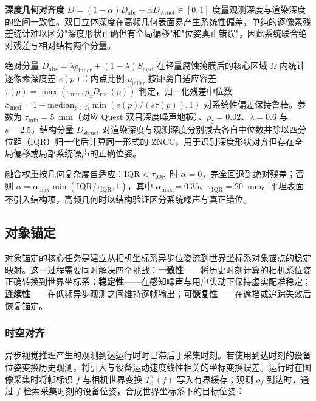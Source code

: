 \documentclass[review]{vgtc}
\begin{document}
\textbf{深度几何对齐度} $D = (1-\alpha) D_{\mathrm{abs}} + \alpha D_{\mathrm{struct}} \in [0,1]$ 度量观测深度与渲染深度的空间一致性。双目立体深度在高频几何表面易产生系统性偏差，单纯的逐像素残差统计难以区分"深度形状正确但有全局偏移"和"位姿真正错误"，因此系统联合绝对残差与相对结构两个分量。

绝对分量 $D_{\mathrm{abs}} = \lambda \rho_{\mathrm{inlier}} + (1-\lambda) S_{\mathrm{med}}$ 在轻量腐蚀掩膜后的核心区域 $\Omega$ 内统计逐像素深度差 $e(p)$：内点比例 $\rho_{\mathrm{inlier}}$ 按距离自适应容差 $\tau(p) = \max(\tau_{\mathrm{min}}, \rho_z D_{\mathrm{rnd}}(p))$ 判定，归一化残差中位数 $S_{\mathrm{med}} = 1 - \mathrm{median}_{p \in \Omega} \min(e(p)/(s\tau(p)), 1)$ 对系统性偏差保持鲁棒。参数为 $\tau_{\mathrm{min}} = 5$~mm（对应 Quest 双目深度噪声地板）、$\rho_z = 0.02$、$\lambda = 0.6$ 与 $s = 2.5$。结构分量 $D_{\mathrm{struct}}$ 对渲染深度与观测深度分别减去各自中位数并除以四分位距（IQR）归一化后计算同一形式的 ZNCC，用于识别深度形状对齐但存在全局偏移或局部系统噪声的正确位姿。

融合权重按几何复杂度自适应：$\mathrm{IQR} < \tau_{\mathrm{IQR}}$ 时 $\alpha = 0$，完全回退到绝对残差；否则 $\alpha = \alpha_{\mathrm{max}} \min(\mathrm{IQR}/\tau_{\mathrm{IQR}}, 1)$，其中 $\alpha_{\mathrm{max}} = 0.35$、$\tau_{\mathrm{IQR}} = 20$~mm。平坦表面不引入结构项，高频几何时以结构验证区分系统噪声与真正错位。

\subsection{对象锚定}\label{sec:anchoring}


对象锚定的核心任务是建立从相机坐标系异步位姿流到世界坐标系对象锚点的稳定映射。这一过程需要同时解决四个挑战：\textbf{一致性}------将历史时刻计算的相机系位姿正确转换到世界坐标系；\textbf{稳定性}------在感知噪声与用户头动下保持虚实配准稳定；\textbf{连续性}------在低频异步观测之间维持逐帧输出；\textbf{可恢复性}------在遮挡或追踪失效后恢复锚定。

\subsubsection{时空对齐}\label{sec:alignment}


异步视觉推理产生的观测到达运行时时已滞后于采集时刻。若使用到达时刻的设备位姿变换历史观测，将引入与设备运动速度线性相关的坐标变换误差。运行时在图像采集时将帧标识 $f$ 与相机世界变换 $T_c^w(f)$ 写入有界缓存；观测 $o_f$ 到达时，通过 $f$ 检索采集时刻的设备位姿，合成世界坐标系下的目标位姿：
\end{document}
